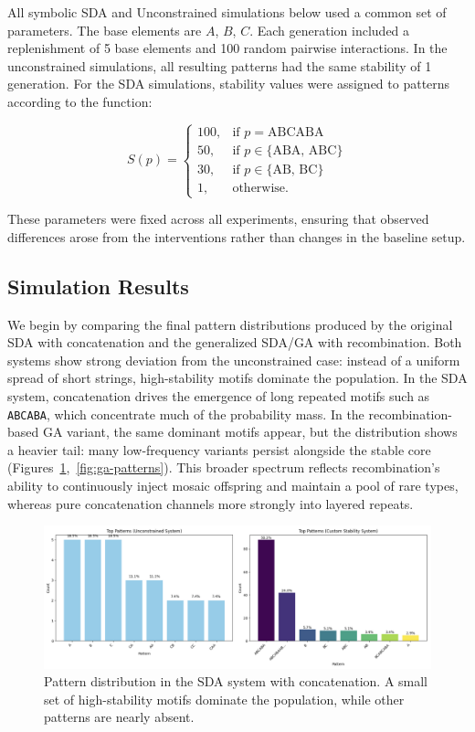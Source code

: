 \documentclass[life,article,submit,pdftex,moreauthors]{Definitions/mdpi}
\begin{document}
All symbolic SDA and Unconstrained simulations below used a common set of parameters. The base elements are $A$, $B$, $C$.
Each generation included
a replenishment of 5 base elements and 100 random pairwise
interactions. In the unconstrained simulations, all resulting patterns had the same stability of 1 generation. For the SDA simulations, 
stability values were assigned to patterns according to the
function:

\begin{equation}
S(p) =
\begin{cases}
100, & \text{if } p = \text{ABCABA} \\
50, & \text{if } p \in \{\text{ABA, ABC}\} \\
30, & \text{if } p \in \{\text{AB, BC}\} \\
1, & \text{otherwise}.
\end{cases}
\end{equation}

These parameters were fixed across all experiments, ensuring
that observed differences arose from the interventions rather than changes in
the baseline setup.

\subsection{Simulation Results}

We begin by comparing the final pattern distributions produced by the original SDA with concatenation and the generalized SDA/GA with recombination. Both systems show strong deviation from the unconstrained case: instead of a uniform spread of short strings, high-stability motifs dominate the population. In the SDA system, concatenation drives the emergence of long repeated motifs such as \texttt{ABCABA}, which concentrate much of the probability mass. In the recombination-based GA variant, the same dominant motifs appear, but the distribution shows a heavier tail: many low-frequency variants persist alongside the stable core (Figures~\ref{fig:concat-patterns},~\ref{fig:ga-patterns}). This broader spectrum reflects recombination’s ability to continuously inject mosaic offspring and maintain a pool of rare types, whereas pure concatenation channels more strongly into layered repeats.

\begin{figure}[H]
    \centering
    \includegraphics[width=1\textwidth]{SDA-concat-patterns.png}
    \caption{Pattern distribution in the SDA system with concatenation. A small set of high-stability motifs dominate the population, while other patterns are nearly absent.}
    \label{fig:concat-patterns}
\end{figure}
\end{document}
